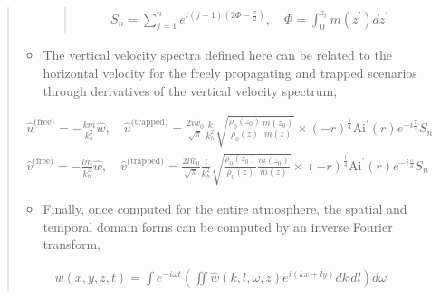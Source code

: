 \documentclass[letterpaper,10pt,english]{sphinxmanual}
\begin{document}
\begin{itemize}
\begin{quote}
\begin{itemize}
\begin{quote}
\begin{itemize}
\end{itemize}
\begin{equation*}
\begin{split}S_n = \sum_{j = 1}^n{e^{i \left( j -1 \right) \left(2 \Phi - \frac{\pi}{2} \right)}}, \quad \Phi = \int_0^{z_t} m \left( z^\prime \right) d z^\prime\end{split}
\end{equation*}\end{quote}

\item {} 
\sphinxAtStartPar
The vertical velocity spectra defined here can be related to the horizontal velocity for the freely propagating and trapped scenarios through derivatives of the vertical velocity spectrum,

\end{itemize}
\begin{equation*}
\begin{split}\hat{u}^\text{(free)} = - \frac{k m}{k_h^2} \hat{w}, \quad
\hat{u}^\text{(trapped)} = \frac{2 i \hat{w}_0 }{\sqrt{\pi}}\frac{k}{k_h^2} \sqrt{ \frac{\rho_0 \left( z_0 \right)}{\rho_0 \left( z \right)} \frac{m \left( z_0 \right)}{m \left( z \right)}} \times \left( - r \right)^\frac{1}{4} \text{Ai}^\prime \left( r \right) e^{-i \frac{\pi}{4}} S_n\end{split}
\end{equation*}\begin{equation*}
\begin{split}\hat{v}^\text{(free)} = - \frac{l m}{k_h^2} \hat{w}, \quad
\hat{v}^\text{(trapped)} = \frac{2 i \hat{w}_0 }{\sqrt{\pi}}\frac{l}{k_h^2} \sqrt{ \frac{\rho_0 \left( z_0 \right)}{\rho_0 \left( z \right)} \frac{m \left( z_0 \right)}{m \left( z \right)}} \times \left( - r \right)^\frac{1}{4} \text{Ai}^\prime \left( r \right) e^{-i \frac{\pi}{4}} S_n\end{split}
\end{equation*}\begin{itemize}
\item {} 
\sphinxAtStartPar
Finally, once computed for the entire atmosphere, the spatial and temporal domain forms can be computed by an inverse Fourier transform,

\end{itemize}
\begin{equation*}
\begin{split}w \left( x, y, z, t \right) = \int{e^{-i \omega t} \left( \iint{ \hat{w} \left( k, l, \omega, z \right) e^{i \left( kx + ly \right)} dk \, dl} \right) d \omega}\end{split}
\end{equation*}


\end{quote}
\end{itemize}
\end{document}
